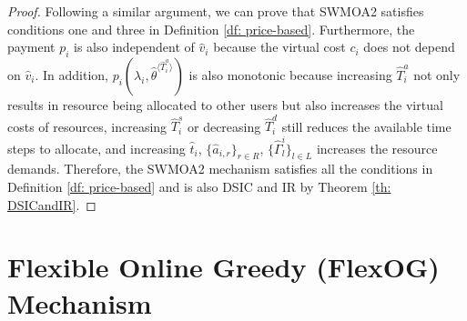\documentclass[11pt]{phdthesis}
\begin{document}
\begin{proof}
    Following a similar argument, we can prove that SWMOA2 satisfies conditions one and three in Definition \ref{df: price-based}. Furthermore, the payment $ p_i$ is also independent of $ \hat{v}_i $ because the virtual cost $ c_i $ does not depend on $ \hat{v}_i $. In addition, $ p_i(\lambda_i, \hat{\theta}^{\langle \hat{T}_i^a \rangle})$ is also monotonic because increasing $\hat{T}_i^a$ not only results in resource being allocated to other users but also increases the virtual costs of resources, increasing $\hat{T}_i^s$ or decreasing $\hat{T}_i^d$ still reduces the available time steps to allocate, and increasing $ \hat{t}_i $, $ \{ \hat{a}_{i,r} \}_{r \in R} $, $ \{ \hat{\Gamma}_l^i \}_{l \in L} $ increases the resource demands. Therefore, the SWMOA2 mechanism satisfies all the conditions in Definition \ref{df: price-based} and is also DSIC and IR by Theorem \ref{th: DSICandIR}.
    
    
\end{proof}


\section{Flexible Online Greedy (FlexOG) Mechanism} \label{FlexOG}
\end{document}
